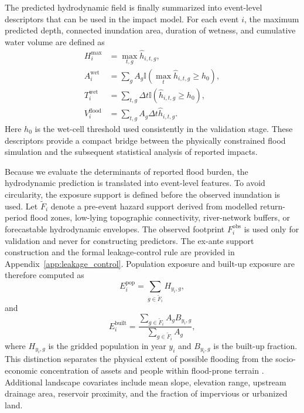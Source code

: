 \documentclass[pdflatex,sn-mathphys-ay]{sn-jnl}
\theoremstyle{thmstyleone}
\begin{document}
The predicted hydrodynamic field is finally summarized into
event-level descriptors that can be used in the impact model.  For each
event $i$, the maximum predicted depth, connected inundation area,
duration of wetness, and cumulative water volume are defined as
\begin{align}
  H^{\max}_{i}
  &=
  \max_{t,g}
  \hat{h}_{i,t,g},
  \label{eq:padr_max_depth}
  \\
  A^{\mathrm{wet}}_{i}
  &=
  \sum_{g}
  A_g
  \mathbb{I}
  \left(
    \max_{t}\hat{h}_{i,t,g}
    \geq h_{0}
  \right),
  \label{eq:padr_wet_area}
  \\
  T^{\mathrm{wet}}_{i}
  &=
  \sum_{t,g}
  \Delta t
  \mathbb{I}
  \left(
    \hat{h}_{i,t,g}
    \geq h_{0}
  \right),
  \label{eq:padr_wet_duration}
  \\
  V^{\mathrm{flood}}_{i}
  &=
  \sum_{t,g}
  A_g
  \Delta t
  \hat{h}_{i,t,g}.
  \label{eq:padr_flood_volume}
\end{align}
Here $h_{0}$ is the wet-cell threshold used consistently in the
validation stage.  These descriptors provide a compact bridge between
the physically constrained flood simulation and the subsequent
statistical analysis of reported impacts.


Because we evaluate the determinants of reported flood
burden, the hydrodynamic prediction is translated into event-level
features.  To avoid circularity, the exposure support is defined before
the observed inundation is used.  Let $\widetilde{F}_{i}$ denote a
pre-event hazard support derived from modelled return-period flood
zones, low-lying topographic connectivity, river-network buffers, or
forecastable hydrodynamic envelopes.  The observed footprint
$F^{\mathrm{obs}}_{i}$ is used only for validation and never for
constructing predictors.  The ex-ante support construction and the
formal leakage-control rule are provided in
Appendix~\ref{app:leakage_control}.  Population exposure and built-up
exposure are therefore computed as
\begin{equation}
  E^{\mathrm{pop}}_{i}
  =
  \sum_{g\in\widetilde{F}_{i}}
  H_{y_i,g},
  \label{eq:pop_exposure}
\end{equation}
and
\begin{equation}
  E^{\mathrm{built}}_{i}
  =
  \frac{
    \displaystyle
    \sum_{g\in\widetilde{F}_{i}} A_g B_{y_i,g}
  }{
    \displaystyle
    \sum_{g\in\widetilde{F}_{i}} A_g
  },
  \label{eq:built_exposure}
\end{equation}
where $H_{y_i,g}$ is the gridded population in year $y_i$ and
$B_{y_i,g}$ is the built-up fraction.  This distinction separates the
physical extent of possible flooding from the socio-economic
concentration of assets and people within flood-prone terrain
\citep{Tellman2021}.  Additional landscape covariates include mean
slope, elevation range, upstream drainage area, reservoir proximity,
and the fraction of impervious or urbanized land.
\end{document}
